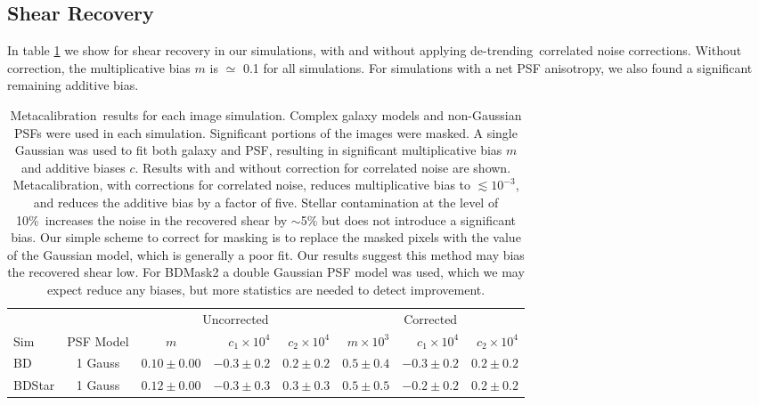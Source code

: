 \documentclass[usegraphicx,usenatbib]{mn2e}
\newcommand{\Mcal}{Metacalibration}
\newcommand{\nsimNstarperc}{10\%}
\newcommand{\detrend}{de-trending}
\begin{document}
\subsection{Shear Recovery}

In table \ref{tab:results} we show for shear recovery in our simulations, with
and without applying \detrend\ correlated noise corrections.  Without
correction, the multiplicative bias $m$ is $\simeq$ 0.1 for all simulations.
For simulations with a net PSF anisotropy, we also found a significant
remaining additive bias.

\begin{table}
    \centering
    \caption{\Mcal\ results for each image simulation.  Complex galaxy models
        and non-Gaussian PSFs were used in each simulation.  Significant
        portions of the images were masked.  A single Gaussian was used
    to fit both galaxy and PSF, resulting in significant multiplicative 
    bias $m$ and additive biases $c$.  Results with and without correction
    for correlated noise are shown.  \Mcal, with corrections for correlated noise,
    reduces multiplicative bias to $\lesssim 10^{-3}$, and reduces the additive
    bias by a factor of five.  
    Stellar contamination at the level of \nsimNstarperc\ increases
    the noise in the recovered shear by $\sim$5\% but does not introduce 
    a significant bias.  
    Our simple scheme to correct for masking is to
    replace the masked pixels with the value of the Gaussian model, which is generally
    a poor fit.  Our results suggest this method may bias the recovered shear low.
    For BDMask2 a double Gaussian PSF model was used, which we may expect reduce any biases, but
    more statistics are needed to detect improvement.
    \label{tab:results}}
    \begin{tabular}{ |l|  |c| c|r|r|  r|r|r|}
        \hline
        & & \multicolumn{3}{c}{Uncorrected} & \multicolumn{3}{c}{Corrected} \\
        Sim & PSF Model & $m$ & $c_1 \times 10^4$ & $c_2 \times 10^4$ & $m \times 10^{3}$ & $c_1 \times 10^4$ & $c_2 \times 10^4$ \\
        \hline
        BD              & 1 Gauss & $0.10 \pm 0.00$ & $-0.3 \pm 0.2$ & $0.2 \pm 0.2$    & $ 0.5 \pm 0.4$ & $-0.3 \pm 0.2$ & $0.2 \pm 0.2$  \\
        BDStar          & 1 Gauss & $0.12 \pm 0.00$ & $-0.3 \pm 0.3$ & $0.3 \pm 0.3$    & $ 0.5 \pm 0.5$ & $-0.2 \pm 0.2$ & $0.2 \pm 0.2$  \\

\end{tabular}
\end{table}
\end{document}
